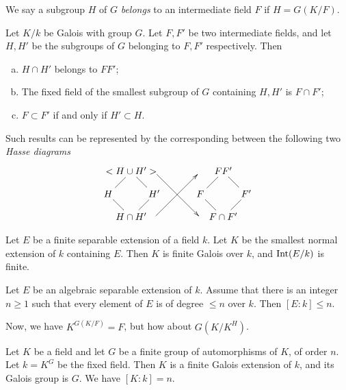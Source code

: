   \begin{defn}
    We say a subgroup $H$ of $G$ \emph{\red belongs} to an intermediate field $F$ if $H=G(K/F)$.
  \end{defn}

  \begin{cor}
    Let $K/k$ be Galois with group $G$. Let $F,F'$ be two intermediate fields, and let $H,H'$ be the subgroups of $G$ belonging to $F,F'$ respectively. Then
    \begin{enumerate}[a)]
      \item  $H\cap H'$ belongs to $FF'$;
      \item  The fixed field of the smallest subgroup of $G$ containing $H,H'$ is $F\cap F'$;
      \item  $F\subset F'$ if and only if $H'\subset H$.
    \end{enumerate}
  \end{cor}
  Such results can be represented by the corresponding between the following two \emph{Hasse diagrams}
                 \begin{displaymath}
                   \xymatrix@!0{
                      & <H\cup H'> &\ar[ddrr]&&& FF' & \\
                      H\ar@{-}[ur]\ar@{-}[dr] && H'\ar@{-}[ul]\ar@{-}[dl] && F\ar@{-}[ur]\ar@{-}[dr] && F'\ar@{-}[ul]\ar@{-}[dl] \\
                      & H\cap H' &\ar[uurr]&&& F\cap F' &            }
                 \end{displaymath}

  \begin{cor}
    Let $E$ be a finite separable extension of a field $k$. Let $K$ be the smallest normal extension of $k$ containing $E$. Then $K$ is finite Galois over $k$, and $\operatorname{Int}(E/k)$ is finite.
  \end{cor}

  \begin{lem}
    Let $E$ be an algebraic separable extension of $k$. Assume that there is an integer $n\geqslant1$ such that every element of $E$ is of degree $\leqslant n$ over $k$. Then $[E:k]\leqslant n$.
  \end{lem}

  Now, we have $K^{G(K/F)}=F$, but how about $G(K/K^H)$.

  \begin{thm}[Artin]
    Let $K$ be a field and let $G$ be a finite group of automorphisms of $K$, of order $n$. Let $k=K^G$ be the fixed field. Then $K$ is a finite Galois extension of $k$, and its Galois group is $G$. We have $[K:k]=n$.
  \end{thm}

